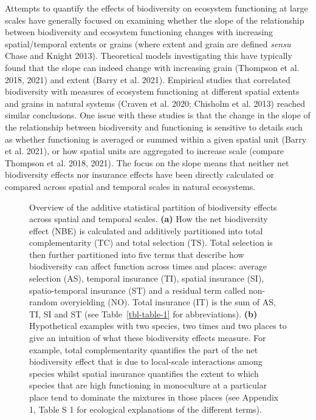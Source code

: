 \documentclass[
  letterpaper,
  DIV=11,
  numbers=noendperiod]{scrartcl}
\begin{document}
Attempts to quantify the effects of biodiversity on ecosystem
functioning at large scales have generally focused on examining whether
the slope of the relationship between biodiversity and ecosystem
functioning changes with increasing spatial/temporal extents or grains
(where extent and grain are defined \emph{sensu} Chase and Knight 2013).
Theoretical models investigating this have typically found that the
slope can indeed change with increasing grain (Thompson et al. 2018,
2021) and extent (Barry et al. 2021). Empirical studies that correlated
biodiversity with measures of ecosystem functioning at different spatial
extents and grains in natural systems (Craven et al. 2020; Chisholm et
al. 2013) reached similar conclusions. One issue with these studies is
that the change in the slope of the relationship between biodiversity
and functioning is sensitive to details such as whether functioning is
averaged or summed within a given spatial unit (Barry et al. 2021), or
how spatial units are aggregated to increase scale (compare Thompson et
al. 2018, 2021). The focus on the slope means that neither net
biodiversity effects nor insurance effects have been directly calculated
or compared across spatial and temporal scales in natural ecosystems.

\begin{figure}


\caption{\label{fig-m1}Overview of the additive statistical partition of
biodiversity effects across spatial and temporal scales. \textbf{(a)}
How the net biodiversity effect (NBE) is calculated and additively
partitioned into total complementarity (TC) and total selection (TS).
Total selection is then further partitioned into five terms that
describe how biodiversity can affect function across times and places:
average selection (AS), temporal insurance (TI), spatial insurance (SI),
spatio-temporal insurance (ST) and a residual term called non-random
overyielding (NO). Total insurance (IT) is the sum of AS, TI, SI and ST
(see Table~\ref{tbl-table-1} for abbreviations). \textbf{(b)}
Hypothetical examples with two species, two times and two places to give
an intuition of what these biodiversity effects measure. For example,
total complementarity quantifies the part of the net biodiversity effect
that is due to local-scale interactions among species whilst spatial
insurance quantifies the extent to which species that are high
functioning in monoculture at a particular place tend to dominate the
mixtures in those places (see Appendix 1, Table S 1 for ecological
explanations of the different terms).}

\end{figure}%
\end{document}
